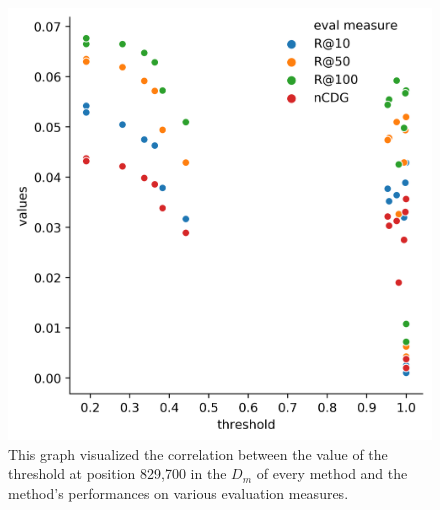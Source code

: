 \begin{figure}[h]
    \centering
	\includegraphics[width=1\linewidth]{./img/nn_threshold_performance_correlation.png}
	\caption[Threshold value and performance correlation graph]{This graph visualized the correlation between the value of the threshold at position 829,700 in the $D_m$ of every method and the method's performances on various evaluation measures.}
	\label{fig:threshold_correlation_graph}
\end{figure}




